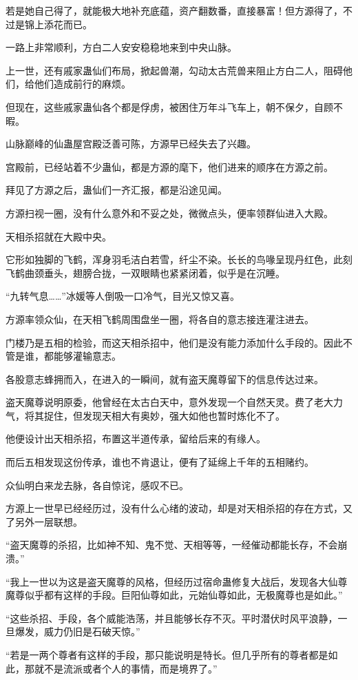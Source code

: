 \begin{this_body}
若是她自己得了，就能极大地补充底蕴，资产翻数番，直接暴富！但方源得了，不过是锦上添花而已。

一路上非常顺利，方白二人安安稳稳地来到中央山脉。

上一世，还有戚家蛊仙们布局，掀起兽潮，勾动太古荒兽来阻止方白二人，阻碍他们，给他们造成前行的麻烦。

但现在，这些戚家蛊仙各个都是俘虏，被困住万年斗飞车上，朝不保夕，自顾不暇。

山脉巅峰的仙蛊屋宫殿泛善可陈，方源早已经失去了兴趣。

宫殿前，已经站着不少蛊仙，都是方源的麾下，他们进来的顺序在方源之前。

拜见了方源之后，蛊仙们一齐汇报，都是沿途见闻。

方源扫视一圈，没有什么意外和不妥之处，微微点头，便率领群仙进入大殿。

天相杀招就在大殿中央。

它形如独脚的飞鹤，浑身羽毛洁白若雪，纤尘不染。长长的鸟喙呈现丹红色，此刻飞鹤曲颈垂头，翅膀合拢，一双眼睛也紧紧闭着，似乎是在沉睡。

“九转气息……”冰媛等人倒吸一口冷气，目光又惊又喜。

方源率领众仙，在天相飞鹤周围盘坐一圈，将各自的意志接连灌注进去。

门楼乃是五相的检验，而这天相杀招中，他们是没有能力添加什么手段的。因此不管是谁，都能够灌输意志。

各股意志蜂拥而入，在进入的一瞬间，就有盗天魔尊留下的信息传达过来。

盗天魔尊说明原委，他曾经在太古白天中，意外发现一个自然天灵。费了老大力气，将其捉住，但发现天相大有奥妙，强大如他也暂时炼化不了。

他便设计出天相杀招，布置这半道传承，留给后来的有缘人。

而后五相发现这份传承，谁也不肯退让，便有了延绵上千年的五相赌约。

众仙明白来龙去脉，各自惊诧，感叹不已。

方源上一世早已经经历过，没有什么心绪的波动，却是对天相杀招的存在方式，又了另外一层联想。

“盗天魔尊的杀招，比如神不知、鬼不觉、天相等等，一经催动都能长存，不会崩溃。”

“我上一世以为这是盗天魔尊的风格，但经历过宿命蛊修复大战后，发现各大仙尊魔尊似乎都有这样的手段。巨阳仙尊如此，元始仙尊如此，无极魔尊也是如此。”

“这些杀招、手段，各个威能浩荡，并且能够长存不灭。平时潜伏时风平浪静，一旦爆发，威力仍旧是石破天惊。”

“若是一两个尊者有这样的手段，那只能说明是特长。但几乎所有的尊者都是如此，那就不是流派或者个人的事情，而是境界了。”


\end{this_body}
